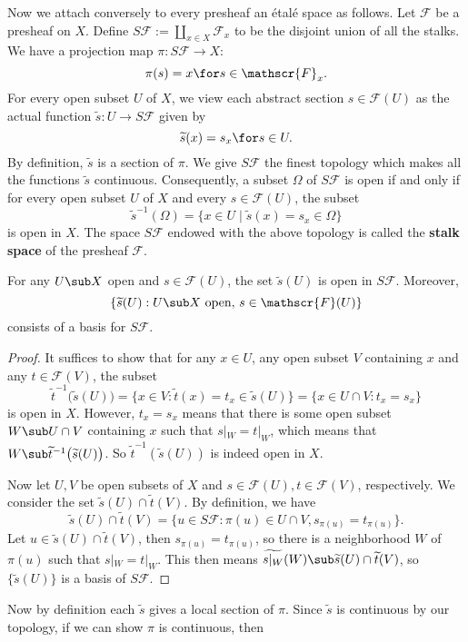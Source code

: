 Now we attach conversely to every presheaf an étalé space as follows. Let $\mathscr{F}$ be a presheaf on $X$. Define $S\mathscr{F}:=\coprod_{x\in X}\mathscr{F}_x$ to be 
the disjoint union of all the stalks. We have a projection map 
$\pi:S\mathscr{F}\to X$:
\[\pi(s)=x\for s\in\mathscr{F}_x.\]
For every open subset $U$ of $X$, we view each abstract section $s\in\mathscr{F}(U)$ as the actual function $\widetilde{s}:U\to S\mathscr{F}$ given by
\[\widetilde{s}(x)=s_x\for s\in U.\]
By definition, $\widetilde{s}$ is a section of $\pi$. We give $S\mathscr{F}$ the finest topology which makes all the functions $\widetilde{s}$ continuous. Consequently, a 
subset $\Omega$ of $S\mathscr{F}$ is open if and only if for every open subset $U$ of $X$ and every $s\in\mathscr{F}(U)$, the subset
\[\widetilde{s}^{-1}(\Omega)=\{x\in U\mid\widetilde{s}(x)=s_x\in\Omega\}\]
is open in $X$. The space $S\mathscr{F}$ endowed with the above topology is called the \textbf{stalk space} of the presheaf $\mathscr{F}$.
\begin{lemma}
For any $U\sub X$ open and $s\in\mathscr{F}(U)$, the set $\widetilde{s}(U)$ is open in $S\mathscr{F}$. Moreover, 
\[\{\widetilde{s}(U):\text{$U\sub X$ open, $s\in\mathscr{F}(U)$}\}\] 
consists of a basis for $S\mathscr{F}$.
\end{lemma}
\begin{proof}
It suffices to show that for any $x\in U$, any open subset $V$ containing $x$ and any $t\in\mathscr{F}(V)$, the subset
\[\widetilde{t}^{-1}\big(\widetilde{s}(U)\big)=\{x\in V:\widetilde{t}(x)=t_x\in\widetilde{s}(U)\}=\{x\in U\cap V:t_x=s_x\}\]
is open in $X$. However, $t_x=s_x$ means that there is some open subset $W\sub U\cap V$ containing $x$ such that $s|_W=t|_W$, which means that 
$W\sub\widetilde{t}^{-1}\big(\widetilde{s}(U)\big)$. So $\widetilde{t}^{-1}(\widetilde{s}(U))$ is indeed open in $X$.\par
Now let $U,V$ be open subsets of $X$ and $s\in\mathscr{F}(U),t\in\mathscr{F}(V)$, respectively. We consider the set $\widetilde{s}(U)\cap\widetilde{t}(V)$. By definition, 
we have
\[\widetilde{s}(U)\cap\widetilde{t}(V)=\{u\in S\mathscr{F}:\pi(u)\in U\cap V,s_{\pi(u)}=t_{\pi(u)}\}.\]
Let $u\in\widetilde{s}(U)\cap\widetilde{t}(V)$, then $s_{\pi(u)}=t_{\pi(u)}$, so there is a neighborhood $W$ of $\pi(u)$ such that $s|_{W}=t|_{W}$. This then means 
$\widetilde{s|_{W}}(W)\sub\widetilde{s}(U)\cap\widetilde{t}(V)$, so $\{\widetilde{s}(U)\}$ is a basis of $S\mathscr{F}$.
\end{proof}
Now by definition each $\widetilde{s}$ gives a local section of $\pi$. Since $\widetilde{s}$ is continuous by our topology, if we can show $\pi$ is continuous, then 
